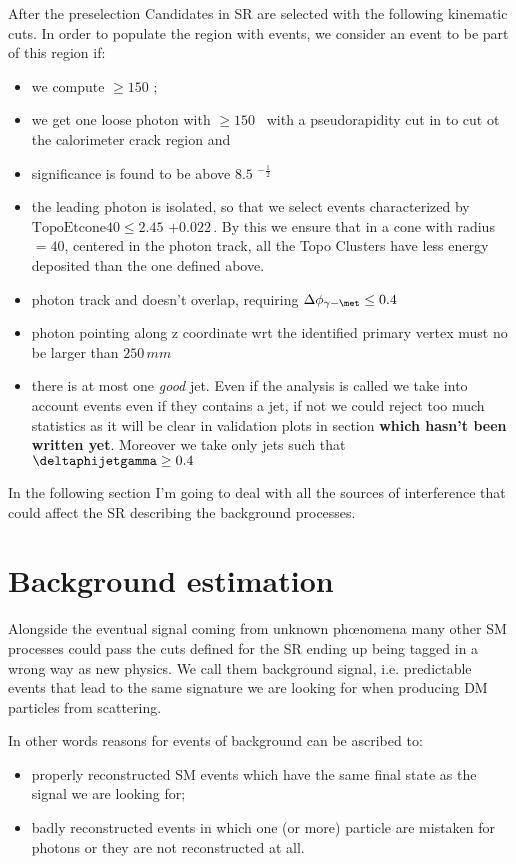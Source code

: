 After the preselection Candidates in SR are selected with the following kinematic cuts. In order to populate the region with \gmet events, we consider an event to be part of this region if:
\begin{itemize}
\item we compute \met $ \ge 150 $ \GeV;
\item we get one loose photon with \pt $ \ge 150 $ \GeV $\,$ with a pseudorapidity cut in  to cut ot the calorimeter crack region and 
\item \met significance is found to be above $8.5$ \GeV$^{-\frac{1}{2}}$
\item the leading photon is isolated, so that we select events characterized by $ \text{TopoEtcone40} \le 2.45$ \GeV$ + 0.022 \, $\pt \GeV. By this we ensure that in a cone with radius \DeltaRdef $ = 40$, centered in the photon track, all the Topo Clusters have less energy deposited than the one defined above.
\item photon track and \met doesn't overlap, requiring $\Delta\phi_{\gamma - \met} \le 0.4$
\item photon pointing along z coordinate wrt the identified primary vertex must no be larger than $250 \, mm$
\item there is at most one {\itshape good} jet. Even if the analysis is called \mph we take into account events even if they contains a jet, if not we could reject too much statistics as it will be clear in validation plots in section {\bfseries which hasn't been written yet}. Moreover we take only jets such that $\deltaphijetgamma \ge 0.4$

\end{itemize}

In the following section I'm going to deal with all the sources of interference that could affect the SR describing the background processes.

\section{Background estimation}
Alongside the eventual signal coming from unknown ph\oe nomena many other SM processes could pass the cuts defined for the SR ending up being tagged in a wrong way as new physics. We call them background signal, i.e. predictable events that lead to the same signature we are looking for when producing DM particles from \pp scattering.

In other words reasons for events of background can be ascribed to:
\begin{itemize}
\item properly reconstructed SM events which have the same final state as the signal we are looking for;
\item badly reconstructed events in which one (or more) particle are mistaken for photons or they are not reconstructed at all.
\end{itemize}

